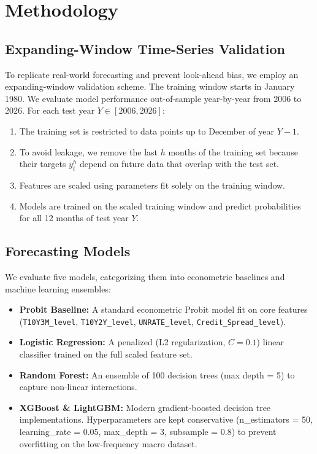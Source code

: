 \documentclass[11pt]{article}
\begin{document}
\section{Methodology}
\subsection{Expanding-Window Time-Series Validation}
To replicate real-world forecasting and prevent look-ahead bias, we employ an expanding-window validation scheme. The training window starts in January 1980. We evaluate model performance out-of-sample year-by-year from 2006 to 2026.
For each test year $Y \in [2006, 2026]$:
\begin{enumerate}
    \item The training set is restricted to data points up to December of year $Y-1$.
    \item To avoid leakage, we remove the last $h$ months of the training set because their targets $y_t^h$ depend on future data that overlap with the test set.
    \item Features are scaled using parameters fit solely on the training window.
    \item Models are trained on the scaled training window and predict probabilities for all 12 months of test year $Y$.
\end{enumerate}

\subsection{Forecasting Models}
We evaluate five models, categorizing them into econometric baselines and machine learning ensembles:
\begin{itemize}
    \item \textbf{Probit Baseline:} A standard econometric Probit model fit on core features (\texttt{T10Y3M\_level}, \texttt{T10Y2Y\_level}, \texttt{UNRATE\_level}, \texttt{Credit\_Spread\_level}).
    \item \textbf{Logistic Regression:} A penalized (L2 regularization, $C=0.1$) linear classifier trained on the full scaled feature set.
    \item \textbf{Random Forest:} An ensemble of 100 decision trees (max depth = 5) to capture non-linear interactions.
    \item \textbf{XGBoost & LightGBM:} Modern gradient-boosted decision tree implementations. Hyperparameters are kept conservative (n\_estimators = 50, learning\_rate = 0.05, max\_depth = 3, subsample = 0.8) to prevent overfitting on the low-frequency macro dataset.
\end{itemize}
\end{document}
